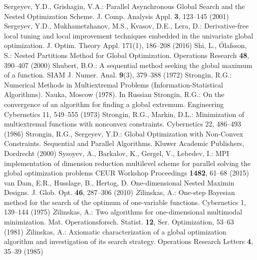 \begin{thebibliography}{99.}
	Sergeyev, Y.D., Grishagin, V.A.: Parallel Asynchronous Global Search and the Nested Optimization Scheme. J. Comp. Analysis Appl. \textbf{3}, 123--145 (2001)
 Sergeyev, Y.D., Mukhametzhanov, M.S., Kvasov, D.E., Lera, D.: Derivative-free local tuning and local improvement techniques embedded in the univariate global optimization. J. Optim. Theory Appl. 171(1), 186--208 (2016)
   Shi, L., {\'O}lafsson, S.: Nested Partitions Method for Global Optimization. Operations Research \textbf{48}, 390--407 (2000)
 Shubert, B.O.: A sequential method seeking the global maximum of a function. SIAM J. Numer. Anal. \textbf{9}(3), 379–388 (1972)
	Strongin, R.G.: Numerical Methods in Multiextremal Problems (Information-Statistical Algorithms). Nauka, Moscow (1978). In Russian
 Strongin, R.G.: On the convergence of an algorithm for finding a global extremum. Engineering Cybernetics 11, 549–555 (1973)
 Strongin, R.G., Markin, D.L.: Minimization of multiextremal functions with nonconvex constraints. Cybernetics 22, 486–493 (1986)
 Strongin, R.G., Sergeyev, Y.D.: Global Optimization with Non-Convex Constraints. Sequential and Parallel Algorithms. Kluwer Academic Publishers, Dordrecht (2000) 
 Sysoyev, A., Barkalov, K., Gergel, V., Lebedev, I.: MPI implementation of dimension reduction multilevel scheme for parallel solving the global optimization problems  CEUR Workshop Proceedings \textbf{1482}, 61--68 (2015)
	van Dam, E.R., Husslage, B., Hertog, D. One-dimensional Nested Maximin Designs. J. Glob. Opt. \textbf{46}, 287--306 (2010)
 $\check{Z}$ilinskas, A.: One-step Bayesian method for the search of the optimum of one-variable functions. Cybernetics 1, 139--144 (1975)
 $\check{Z}$ilinskas, A.: Two algorithms for one-dimensional multimodal minimization. Mat. Operationsforsch. Statist. \textbf{12}, Ser. Optimization, 53--63 (1981)
 $\check{Z}$ilinskas, A.: Axiomatic characterization of a global optimization algorithm and investigation of its search strategy. Operations Research Letters \textbf{4}, 35--39 (1985)
\end{thebibliography}

%